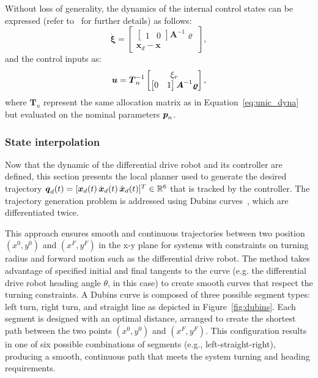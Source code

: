 Without loss of generality, the dynamics of the internal control states can be expressed (refer to~\cite{cDFL} for further details) as follows:
\begin{equation}
  \dot{\boldsymbol{\xi}} = 
  \begin{bmatrix}
    \begin{bmatrix}1 & 0\end{bmatrix}\boldsymbol{A}^{-1}\boldsymbol{\varrho} \\
    \boldsymbol{x}_d - \boldsymbol{x}
  \end{bmatrix}, 
\end{equation}
and the control inputs as:
\begin{equation}
  \boldsymbol{u} = \boldsymbol{T}_n^{-1} 
  \begin{bmatrix}
    \xi_v \\
    \begin{bmatrix}0 & 1\end{bmatrix}\boldsymbol{A}^{-1}\boldsymbol{\varrho}
  \end{bmatrix},
\end{equation}
where $\boldsymbol{T}_n$ represent the same allocation matrix as in Equation~\ref{eq:unic_dyna} but evaluated on the nominal parameters $\boldsymbol{p}_n$.

\subsubsection{State interpolation}\label{sec:dubins}

Now that the dynamic of the differential drive robot and its controller are defined, this section presents the local planner used to generate the desired trajectory $\boldsymbol{q}_d(t) = [\boldsymbol{x}_d(t) \, \dot{\boldsymbol{x}}_d(t) \, \ddot{\boldsymbol{x}}_d(t)]^T \in \mathbb{R}^6$ that is tracked by the  controller.
The trajectory generation problem is addressed using Dubins curves~\cite{cDubins}, which are differentiated twice. 

This approach ensures smooth and continuous trajectories between two position $(x^0, y^0)$ and $(x^F, y^F)$ in the x-y plane for systems with constraints on turning radius and forward motion such as the differential drive robot.
The method takes advantage of specified initial and final tangents to the curve (e.g. the differential drive robot heading angle $\theta$, in this case) to create smooth curves that respect the turning constraints.
A Dubins curve is composed of three possible segment types: left turn, right turn, and straight line as depicted in Figure~\ref{fig:dubins}. 
Each segment is designed with an optimal distance, arranged to create the shortest path between the two points $(x^0, y^0)$ and $(x^F, y^F)$. 
This configuration results in one of six possible combinations of segments (e.g., left-straight-right), producing a smooth, continuous path that meets the system turning and heading requirements.

